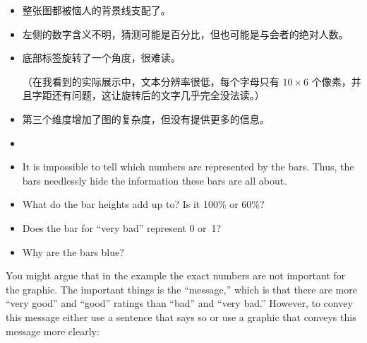 \begin{itemize}
\item
  整张图都被恼人的背景线支配了。
\item
  左侧的数字含义不明，猜测可能是百分比，但也可能是与会者的绝对人数。
\item
  底部标签旋转了一个角度，很难读。

  （在我看到的实际展示中，文本分辨率很低，每个字母只有 $10 \times 6$ 个像素，并且字距还有问题，这让旋转后的文字几乎完全没法读。）
\item
  第三个维度增加了图的复杂度，但没有提供更多的信息。
\item

\item
  It is impossible to tell which  numbers are represented by the
  bars. Thus, the bars needlessly hide the information these bars are
  all about.
\item
  What do the bar heights add up to? Is it 100\% or 60\%?
\item
  Does the bar for ``very bad'' represent 0 or~1?
\item
  Why are the bars blue?
\end{itemize}

You might argue that in the example the exact numbers are not
important for the graphic. The important things is the ``message,''
which is that there are more ``very good'' and ``good'' ratings than
``bad'' and ``very bad.'' However, to convey this message either use a
sentence that says so or use a graphic that conveys this message more
clearly:

